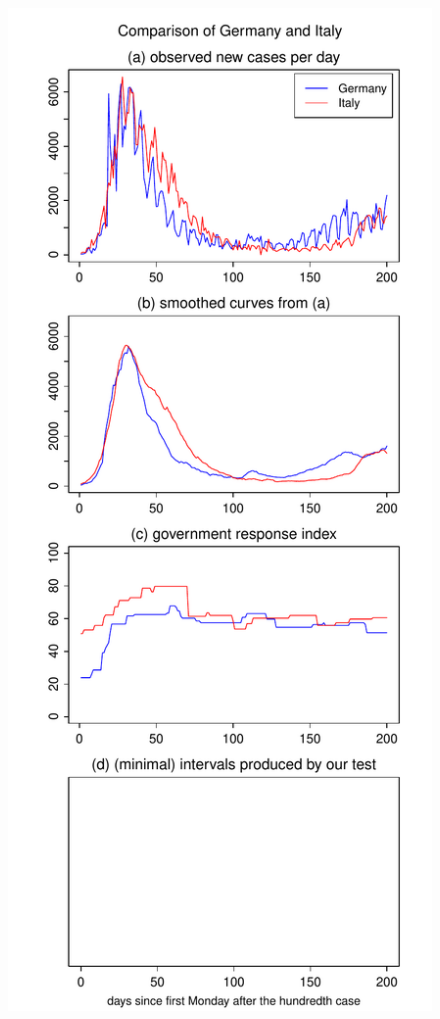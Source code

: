 \documentclass[a4paper,12pt]{article}
\numberwithin{equation}{section}
\begin{document}
{\begin{figure}[h!]
\begin{minipage}[t]{0.49\textwidth}
\includegraphics[width=\textwidth]{plots/DEU_vs_ITA_long}

\end{minipage}
\end{figure}}
\end{document}
